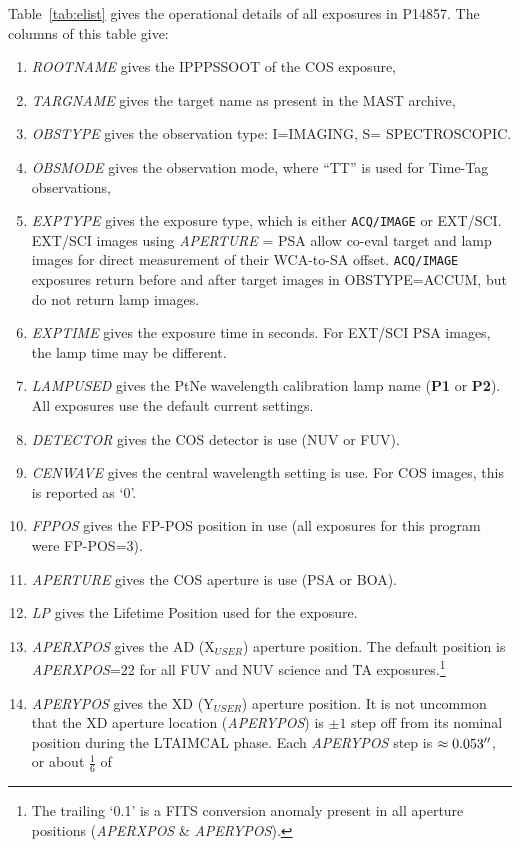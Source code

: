 \documentclass[12pt]{reportj}
\def\arcsec{\hbox{$^{\prime\prime}$}}
\newcommand{\plampone}{{\bf P1}}
\newcommand{\plamptwo}{{\bf P2}}
\newcommand{\pid}[1]{{\rm P}#1}
\newcommand{\fsw}[1]{{\textsc LTA#1}}
\newcommand{\tacq}[1]{\texttt{ACQ/#1}}
\begin{document}
Table~\ref{tab:elist} gives the operational details of all exposures in \pid{14857}. The columns of this table give:
\footnotesize
\begin{enumerate}
\item \textit{ROOTNAME} gives the IPPPSSOOT of the COS exposure,
\item \textit{TARGNAME} gives the target name as present in the MAST archive,
\item \textit{OBSTYPE} gives the observation type: I=IMAGING, S= SPECTROSCOPIC.
\item \textit{OBSMODE} gives the observation mode, where ``TT'' is used for Time-Tag observations,
\item \textit{EXPTYPE} gives the exposure type, which is either \tacq{IMAGE} or EXT/SCI. EXT/SCI images using \textit{APERTURE} = PSA allow co-eval target and lamp images for direct measurement of their WCA-to-SA offset. \tacq{IMAGE} exposures return before and after target images in \textsc{OBSTYPE}=ACCUM, but do not return lamp images.
\item \textit{EXPTIME} gives the exposure time in seconds. For EXT/SCI PSA images, the lamp time may be different.
\item \textit{LAMPUSED} gives the PtNe wavelength calibration lamp name (\plampone{} or \plamptwo{}). All exposures use the default current settings.
\item \textit{DETECTOR} gives the COS detector is use (NUV or FUV).
\item \textit{CENWAVE} gives the central wavelength setting is use. For COS images, this is reported as `0'.
\item \textit{FPPOS} gives the FP-POS position in use (all exposures for this program were FP-POS=3).
\item \textit{APERTURE} gives the COS aperture is use (PSA or BOA).
\item \textit{LP} gives the Lifetime Position used for the exposure.
\item \textit{APERXPOS} gives the AD (X$_{USER}$) aperture position. The default position is \textit{APERXPOS}=22 for all FUV and NUV science and TA exposures.\footnote{The trailing `0.1' is a FITS conversion anomaly present in all aperture positions (\textit{APERXPOS} \& \textit{APERYPOS}).}
\item \textit{APERYPOS} gives the XD (Y$_{USER}$) aperture position. It is not uncommon that the XD aperture location (\textit{APERYPOS}) is $\pm 1$ step off from its nominal position during the \fsw{IMCAL} phase. Each \textit{APERYPOS} step is $\approx0.053\arcsec$, or about $\frac{1}{6}$ of

\end{enumerate}
\end{document}

